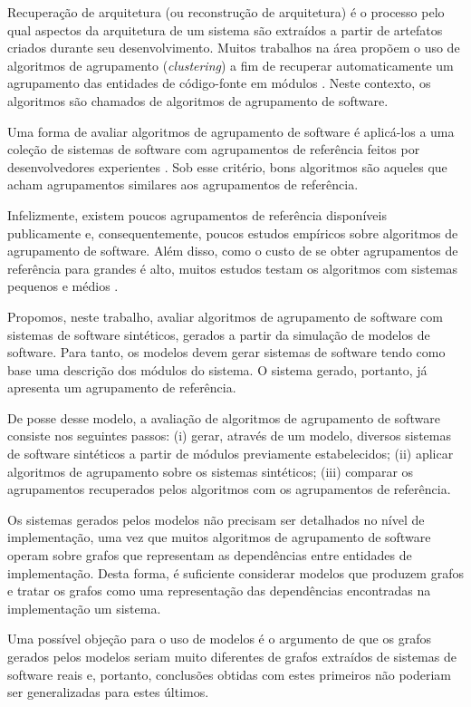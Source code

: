 Recuperação de arquitetura (ou reconstrução de arquitetura) é o processo pelo qual aspectos da arquitetura de um sistema são extraídos a partir de artefatos criados durante seu desenvolvimento. Muitos trabalhos na área propõem o uso de algoritmos de agrupamento (\emph{clustering}) a fim de recuperar automaticamente um agrupamento das entidades de código-fonte em módulos \cite{Mancoridis1998,Andritsos2005,Maqbool2007}. Neste contexto, os algoritmos são chamados de algoritmos de agrupamento de software.

Uma forma de avaliar algoritmos de agrupamento de software é aplicá-los a uma coleção de sistemas de software com agrupamentos de referência feitos por desenvolvedores experientes \cite{Anquetil1999}. Sob esse critério, bons algoritmos são aqueles que acham agrupamentos similares aos agrupamentos de referência.

Infelizmente, existem poucos agrupamentos de referência disponíveis publicamente \cite{Koschke2000} e, consequentemente, poucos estudos empíricos sobre algoritmos de agrupamento de software. Além disso, como o custo de se obter agrupamentos de referência para grandes é alto, muitos estudos testam os algoritmos com sistemas pequenos e médios \cite{Anquetil1999,Maqbool2007,Bittencourt2009}.

Propomos, neste trabalho, avaliar algoritmos de agrupamento de software com sistemas de software sintéticos, gerados a partir da simulação de modelos de software. Para tanto, os modelos devem gerar sistemas de software tendo como base uma descrição dos módulos do sistema. O sistema gerado, portanto, já apresenta um agrupamento de referência.

De posse desse modelo, a avaliação de algoritmos de agrupamento de software consiste nos seguintes passos: (i) gerar, através de um modelo, diversos sistemas de software sintéticos a partir de módulos previamente estabelecidos; (ii) aplicar algoritmos de agrupamento sobre os sistemas sintéticos; (iii) comparar os agrupamentos recuperados pelos algoritmos com os agrupamentos de referência.

Os sistemas gerados pelos modelos não precisam ser detalhados no nível de implementação, uma vez que muitos algoritmos de agrupamento de software operam sobre grafos que representam as dependências entre entidades de implementação. Desta forma, é suficiente considerar modelos que produzem grafos e tratar os grafos como uma representação das dependências encontradas na implementação um sistema.

Uma possível objeção para o uso de modelos é o argumento de que os grafos gerados pelos modelos seriam muito diferentes de grafos extraídos de sistemas de software reais e, portanto, conclusões obtidas com estes primeiros não poderiam ser generalizadas para estes últimos.

